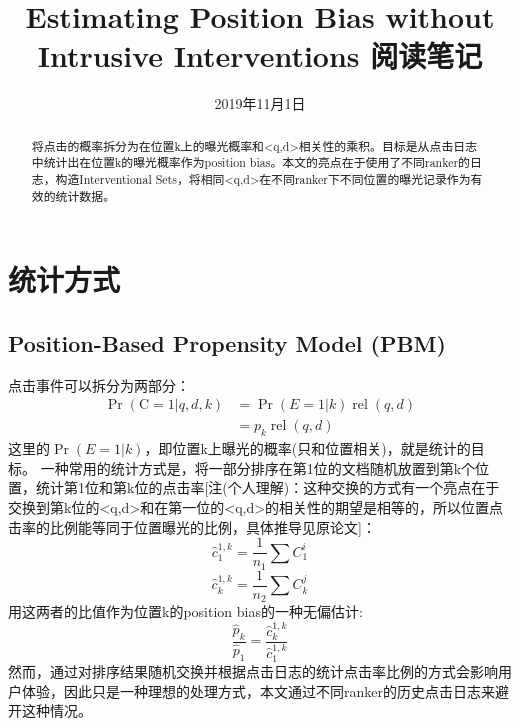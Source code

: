 \documentclass[UTF8]{ctexart}
\title{Estimating Position Bias without Intrusive Interventions 阅读笔记}
\date{2019年11月1日}
\begin{document}
\maketitle
\begin{abstract}
将点击的概率拆分为在位置k上的曝光概率和<q,d>相关性的乘积。目标是从点击日志中统计出在位置k的曝光概率作为position bias。本文的亮点在于使用了不同ranker的日志，构造Interventional Sets，将相同<q,d>在不同ranker下不同位置的曝光记录作为有效的统计数据。
\end{abstract}
\section{统计方式}
\subsection{ Position-Based Propensity Model (PBM)}
点击事件可以拆分为两部分：
$$
\begin{aligned} \operatorname{Pr}(\mathrm{C}=1 | q, d, k) &=\operatorname{Pr}(E=1 | k) \operatorname{rel}(q, d) \\ &=p_{k} \operatorname{rel}(q, d) \end{aligned}
$$
这里的$\operatorname{Pr}(E=1 | k) $，即位置k上曝光的概率(只和位置相关)，就是统计的目标。
一种常用的统计方式是，将一部分排序在第1位的文档随机放置到第k个位置，统计第1位和第k位的点击率[注(个人理解)：这种交换的方式有一个亮点在于交换到第k位的<q,d>和在第一位的<q,d>的相关性的期望是相等的，所以位置点击率的比例能等同于位置曝光的比例，具体推导见原论文]：
\begin{equation}
\hat{c}_{1}^{1, k}=\frac{1}{n_{1}} \sum C_{1}^{i} 
\end{equation}
\begin{equation}
\hat{c}_{k}^{1, k}=\frac{1}{n_{2}} \sum C_{k}^{j} 
\end{equation}
用这两者的比值作为位置k的position bias的一种无偏估计:
\begin{equation}
\frac{\hat{p}_{k}}{\hat{p}_{1}}=\frac{\hat{c}_{k}^{1, k}}{\hat{c}_{1}^{1, k}}
\end{equation}
然而，通过对排序结果随机交换并根据点击日志的统计点击率比例的方式会影响用户体验，因此只是一种理想的处理方式，本文通过不同ranker的历史点击日志来避开这种情况。
\end{document}
